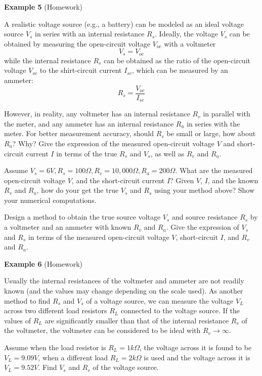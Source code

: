 \begin{itemize}
{\bf Example 5} (Homework)


A realistic voltage source (e.g., a battery) can be modeled as an ideal 
voltage source $V_s$ in series with an internal resistance $R_s$. Ideally,
the voltage $V_s$ can be obtained by measuring the open-circuit voltage 
$V_{oc}$ with a voltmeter
\[ V_s=V_{oc} \]
while the internal resistance $R_s$ can be obtained as the ratio of the 
open-circuit voltage $V_{oc}$ to the shirt-circuit current $I_{sc}$, which 
can be measured by an ammeter:
\[ R_s=\frac{V_{oc}}{I_{sc}} \]

However, in reality, any voltmeter has an internal resistance $R_v$ in 
parallel with the meter, and any ammeter has an internal resistance $R_a$ 
in series with the meter. For better measurement accuracy, should $R_v$ be
small or large, how about $R_a$? Why? Give the expression of the measured
open-circuit voltage $V$ and short-circuit current $I$ in terms of the
true $R_s$ and $V_s$, as well as $R_v$ and $R_a$.

Assume $V_s=6V, R_s=100\Omega, R_v=10,000 \Omega, R_a=200 \Omega$. What
are the measured open-circuit voltage $V$, and the short-circuit current 
$I$? Given $V$, $I$, and the known $R_v$ and $R_a$, how do your get the 
true $V_s$ and $R_s$ using your method above? Show your numerical computations.


Design a method to obtain the true source voltage $V_s$ and source resistance
$R_s$ by a voltmeter and an ammeter with known $R_v$ and $R_a$. Give the 
expression of $V_s$ and $R_s$ in terms of the measured open-circuit voltage 
$V$, short-circuit $I$, and $R_v$ and $R_a$. 



{\bf Example 6} (Homework)

Usually the internal resistances of the voltmeter and ammeter are not 
readily known (and the values may change depending on the scale used). 
As another method to find $R_s$ and $V_s$ of a voltage source, we can 
measure the voltage $V_L$ across two different load resistors $R_L$ 
connected to the voltage source. If the values of $R_L$ are significantly
smaller than that of the internal resistance $R_v$ of the voltmeter, the 
voltmeter can be considered to be ideal with $R_v\rightarrow \infty$. 

Assume when the load resistor is $R_L=1 k\Omega$, the voltage across it 
is found to be $V_L=9.09V$, when a different load $R_L=2 k\Omega$ is used 
and the voltage across it is $V_L=9.52V$. Find $V_s$ and $R_s$ of the 
voltage source.


\end{itemize}
